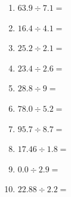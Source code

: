 \documentclass[12pt]{article}
\begin{document}
\begin{enumerate}
\newpage
\item \large $ 63.9 \div 7.1 = $ \vspace{1.5cm}
\item \large $ 16.4 \div 4.1 = $ \vspace{1.5cm}
\item \large $ 25.2 \div 2.1 = $ \vspace{1.5cm}
\item \large $ 23.4 \div 2.6 = $ \vspace{1.5cm}
\item \large $ 28.8 \div 9 = $ \vspace{1.5cm}
\item \large $ 78.0 \div 5.2 = $ \vspace{1.5cm}
\item \large $ 95.7 \div 8.7 = $ \vspace{1.5cm}
\item \large $ 17.46 \div 1.8 = $ \vspace{1.5cm}
\item \large $ 0.0 \div 2.9 = $ \vspace{1.5cm}
\item \large $ 22.88 \div 2.2 = $ \vspace{1.5cm}
\end{enumerate}\newpage
\end{document}
